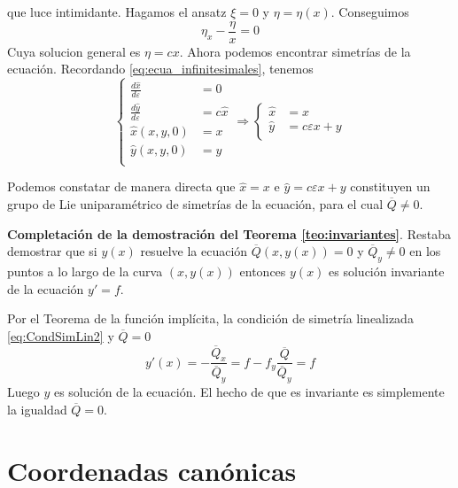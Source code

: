 \documentclass[handout,hyperref={colorlinks=true}]{beamer}
\renewcommand{\epsilon}{\varepsilon}
\begin{document}
que luce intimidante. Hagamos el ansatz $\xi=0$ y $\eta=\eta(x)$. Conseguimos
\[\eta_x-\frac{\eta}{x}=0\]
Cuya solucion general es $\boxed{\eta=cx}$. Ahora podemos encontrar simetrías de la ecuación. Recordando \eqref{eq:ecua_infinitesimales}, tenemos
\[
\left\{
\begin{array}{ll}
\frac{d\hat{x}}{d\epsilon}&=0\\
\frac{d\hat{y}}{d\epsilon}&=c\hat{x}\\
\hat{x}(x,y,0)&=x\\
\hat{y}(x,y,0)&=y\\
\end{array}
\right.
\Rightarrow
\left\{
\begin{array}{ll}
\hat{x}&=x\\
\hat{y}&=c\epsilon x+y\\
\end{array}
\right.
\]

Podemos constatar de manera directa que $\hat{x}=x$ e $\hat{y}=c\epsilon x+y$ constituyen un grupo de Lie uniparamétrico de simetrías de la ecuación, para el cual $\overline{Q}\neq 0$.

\textbf{Completación de la demostración  del Teorema \ref{teo:invariantes}}.
Restaba demostrar que si $y(x)$ resuelve la ecuación $\overline{Q}(x,y(x))=0$ y $\overline{Q}_y\neq 0$ en los puntos a lo largo de la curva $(x,y(x))$ entonces $y(x)$ es solución invariante de la ecuación $y'=f$.

Por el Teorema de la función implícita,
la condición de simetría linealizada \eqref{eq:CondSimLin2} y $\overline{Q}=0$
\[y'(x)=-\frac{\overline{Q}_x}{\overline{Q}_y}=f-f_y\frac{\overline{Q}}{\overline{Q}_y}=f\]
Luego $y$ es solución de la ecuación. El hecho de que es invariante es simplemente la igualdad
$\overline{Q}=0$.





























\section{Coordenadas canónicas}
\end{document}

